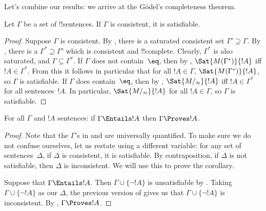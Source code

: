 \documentclass[../../../include/open-logic-section]{subfiles}
\begin{document}

Let's combine our results: we arrive at the G\"odel's completeness theorem.

\begin{thm}
Let $\Gamma$ be a set of !!{sentence}s.  If $\Gamma$ is consistent, it
is satisfiable.
\end{thm}

\begin{proof}
Suppose $\Gamma$ is consistent.  By , there is
a saturated consistent set $\Gamma' \supseteq \Gamma$. By
, there is a $\Gamma^* \supseteq \Gamma'$
which is consistent and !!{complete}. Clearly, $\Gamma^*$ is also
saturated, and $\Gamma \subseteq \Gamma^*$.  If $\Gamma$ does not
contain~$\eq$, then by , $\Sat{M(\Gamma^*)}{!A}$
iff $!A \in \Gamma^*$.  From this it follows in particular that for
all $!A \in \Gamma$, $\Sat{M(\Gamma^*)}{!A}$, so $\Gamma$ is
satisfiable.  If $\Gamma$ does contain~$\eq$, then by
, $\Sat{M/_\approx}{!A}$ iff $!A \in \Gamma^*$
for all sentences~$!A$.  In particular, $\Sat{M/_\approx}{!A}$ for all
$!A \in \Gamma$, so $\Gamma$ is satisfiable.
\end{proof}

\begin{cor}
For all $\Gamma$ and $!A$ sentences: if $\Gamma \Entails !A$ then
$\Gamma \Proves !A$.
\end{cor}

\begin{proof}
Note that the $\Gamma$'s in  and
 are universally quantified.  To make sure we
do not confuse ourselves, let us restate 
using a different variable: for any set of sentences~$\Delta$, if
$\Delta$ is consistent, it is satisfiable.  By contraposition, if
$\Delta$ is not satisfiable, then $\Delta$ is inconsistent.  We will
use this to prove the corollary.

Suppose that $\Gamma \Entails !A$.  Then $\Gamma \cup \{\lnot !A\}$ is
unsatisfiable by .  Taking $\Gamma
\cup \{\lnot !A\}$ as our $\Delta$, the previous version of
 gives us that $\Gamma \cup \{\lnot !A\}$ is
inconsistent.  By
,
$\Gamma \Proves !A$.
\end{proof}
\end{document}

